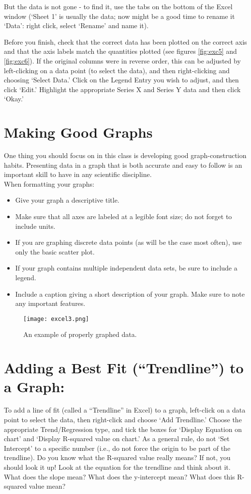 But the data is not gone - to find it, use the tabs on the bottom of the Excel window (`Sheet 1' is usually the data; now might be a good time to rename it `Data': right click, select `Rename' and name it).
\par 
Before you finish, check that the correct data has been plotted on the correct axis and that the axis labels match the quantities plotted (see figures \ref{fig:exc5} and \ref{fig:exc6}). 
If the original columns were in reverse order, this can be adjusted by left-clicking on a data point (to select the data), and then right-clicking and choosing `Select Data.' 
Click on the Legend Entry you wish to adjust, and then click `Edit.' 
Highlight the appropriate Series X and Series Y data and then click `Okay.'

\section*{Making Good Graphs}
One thing you should focus on in this class is developing good graph-construction habits.
Presenting data in a graph that is both accurate and easy to follow is an important skill to have in any scientific discipline. \\
When formatting your graphs:
\begin{itemize}
\item Give your graph a descriptive title.
\item Make sure that all axes are labeled at a legible font size; do not forget to include units.
\item If you are graphing discrete data points (as will be the case most often), use only the basic scatter plot.
\item If your graph contains multiple independent data sets, be sure to include a legend.
\item Include a caption giving a short description of your graph. Make sure to note any important features.
\end{itemize}
\begin{figure}[ht]
\texttt{[image: excel3.png]}
\centering
\caption{An example of properly graphed data.}
\label{fig:exc3}
\end{figure}

\section*{Adding a Best Fit (``Trendline'') to a Graph:}
To add a line of fit (called a ``Trendline'' in Excel) to a graph, left-click on a data point to select the data, then right-click and choose `Add Trendline.' 
Choose the appropriate Trend/Regression type, and tick the boxes for `Display Equation on chart' and `Display R-squared value on chart.' 
As a general rule, do not `Set Intercept' to a specific number (i.e., do not force the origin to be part of the trendline). 
Do you know what the R-squared value really means? 
If not, you should look it up! 
Look at the equation for the trendline and think about it. 
What does the slope mean? 
What does the y-intercept mean? What does this R-squared value mean?

